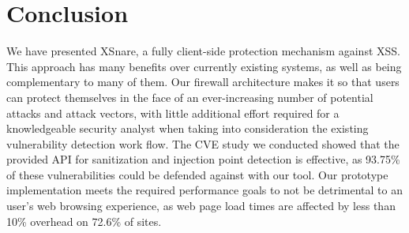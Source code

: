 \section{Conclusion}
We have presented XSnare, a fully client-side protection mechanism against XSS. This approach has many benefits over currently existing systems, as well as being complementary to many of them. Our firewall architecture makes it so that users can protect themselves in the face of an ever-increasing number of potential attacks and attack vectors, with little additional effort required for a knowledgeable security analyst when taking into consideration the existing vulnerability detection work flow. The CVE study we conducted showed that the provided API for sanitization and injection point detection is effective, as 93.75\% of these vulnerabilities could be defended against with our tool. Our prototype implementation meets the required performance goals to not be detrimental to an user's web browsing experience, as web page load times are affected by less than 10\% overhead on 72.6\% of sites.
